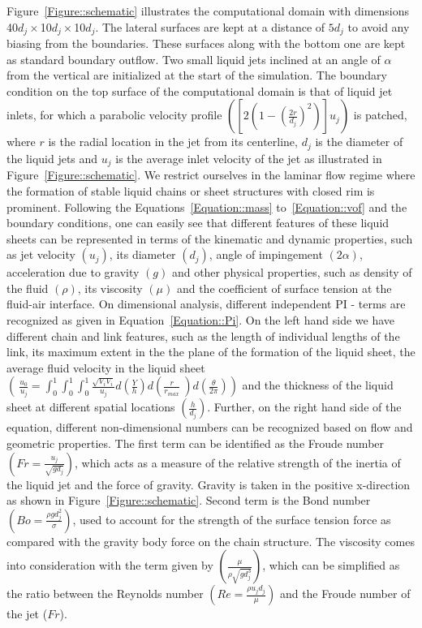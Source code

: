 \documentclass[%
aip,
sd,%
amsmath,amssymb,
preprint,%
author-year,%
]{revtex4-1}
\begin{document}
Figure~\ref{Figure::schematic} illustrates the computational domain with dimensions 40$d_j\times$10$d_j\times$10$d_j$. The lateral surfaces are kept at a distance of $5d_j$ to avoid any biasing from the boundaries. These surfaces along with the bottom one are kept as standard boundary outflow. Two small liquid jets inclined at an angle of $\alpha$ from the vertical are initialized at the start of the simulation. The boundary condition on the top surface of the computational domain is that of liquid jet inlets, for which a parabolic velocity profile $\left(\left[2\left(1 - \left(\frac{2r}{d_j}\right)^2\right) \right]u_j\right)$ is patched, where $r$ is the radial location in the jet from its centerline, $d_j$ is the diameter of the liquid jets and $u_j$ is the average inlet velocity of the jet as illustrated in Figure~\ref{Figure::schematic}. We restrict ourselves in the laminar flow regime where the formation of stable liquid chains or sheet structures with closed rim is prominent. Following the Equations~\ref{Equation::mass} to~\ref{Equation::vof} and the boundary conditions, one can easily see that different features of these liquid sheets can be represented in terms of the kinematic and dynamic properties, such as jet velocity $\left(u_j\right)$, its diameter $\left(d_j\right)$, angle of impingement $\left(2\alpha\right)$, acceleration due to gravity $\left(g\right)$ and other physical properties, such as density of the fluid $\left(\rho\right)$, its viscosity $\left(\mu\right)$ and the coefficient of surface tension at the fluid-air interface. On dimensional analysis, different independent PI - terms are recognized as given in Equation~\ref{Equation::Pi}. On the left hand side we have different chain and link features, such as the length of individual lengths of the link, its maximum extent in the the plane of the formation of the liquid sheet, the average fluid velocity in the liquid sheet $\left(\:\frac{u_0}{u_j} = \int_{0}^{1}\int_{0}^{1}\int_{0}^{1}\frac{\sqrt{V_iV_i}}{u_j}d\left(\frac{Y}{h}\right)d\left(\frac{r}{r_{max}}\:\right)d\left(\frac{\theta}{2\pi}\right) \right)$ and the thickness of the liquid sheet at different spatial locations $\left(\frac{h}{d_j}\right)$. Further, on the right hand side of the equation, different non-dimensional numbers can be recognized based on flow and geometric properties. The first term can be identified as the Froude number $\left(Fr = \frac{u_j}{\sqrt{gd_j}}\right)$, which acts as a measure of the relative strength of the inertia of the liquid jet and the force of gravity. Gravity is taken in the positive x-direction as shown in Figure~\ref{Figure::schematic}. Second term is the Bond number $\left(Bo = \frac{\rho gd_j^2}{\sigma}\right)$, used to account for the strength of the surface tension force as compared with the gravity body force on the chain structure. The viscosity comes into consideration with the term given by $\left(\frac{\mu}{\rho\sqrt{gd_j^3}}\right)$, which can be simplified as the ratio between the Reynolds number $\left(Re = \frac{\rho u_jd_j}{\mu}\right)$ and the Froude number of the jet ($Fr$).
\end{document}
